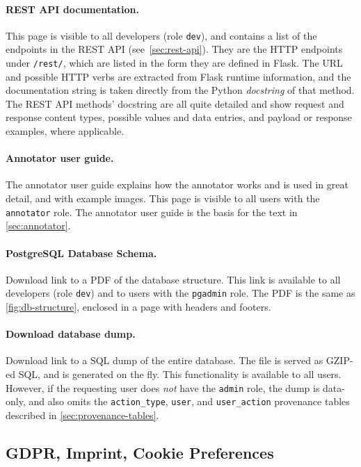 \paragraph*{REST API documentation.}
This page is visible to all developers (role \verb!dev!), and contains a list of the endpoints in the REST API (see~\cref{sec:rest-api}).
They are the HTTP endpoints under \verb!/rest/!, which are listed in the form they are defined in Flask.
The URL and possible HTTP verbs are extracted from Flask runtime information, and the documentation string is taken directly from the Python \emph{docstring} of that method.
The REST API methods' docstring are all quite detailed and show request and response content types, possible values and data entries, and payload or response examples, where applicable.

\paragraph*{Annotator user guide.}
The annotator user guide explains how the annotator works and is used in great detail, and with example images.
This page is visible to all users with the \verb!annotator! role.
The annotator user guide is the basis for the text in \cref{sec:annotator}.

\paragraph*{PostgreSQL Database Schema.}
Download link to a PDF of the database structure.
This link is available to all developers (role \verb!dev!) and to users with the \verb!pgadmin! role.
The PDF is the same as \cref{fig:db-structure}, enclosed in a page with headers and footers.

\paragraph*{Download database dump.}
Download link to a SQL dump of the entire database.
The file is served as GZIP-ed SQL, and is generated on the fly.
This functionality is available to all users.
However, if the requesting user does \emph{not} have the \verb!admin! role, the dump is data-only, and also omits the \verb!action_type!, \verb!user!, and \verb!user_action! provenance tables described in \cref{sec:provenance-tables}.


\subsection{GDPR, Imprint, Cookie Preferences}

